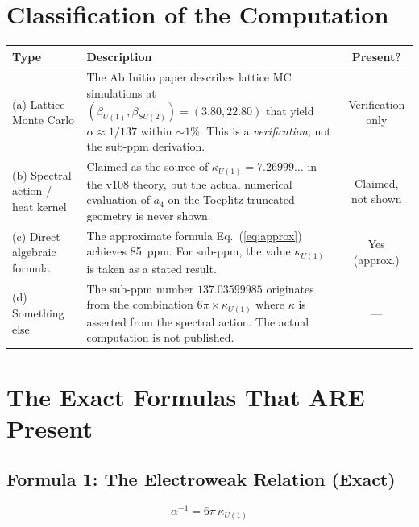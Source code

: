 \documentclass[11pt]{article}
\begin{document}
\section{Classification of the Computation}

\begin{center}
\renewcommand{\arraystretch}{1.4}
\begin{tabular}{lp{8cm}c}
\toprule
\textbf{Type} & \textbf{Description} & \textbf{Present?} \\
\midrule
(a) Lattice Monte Carlo &
  The Ab Initio paper describes lattice MC simulations at
  $(\beta_{U(1)}, \beta_{SU(2)}) = (3.80, 22.80)$ that yield
  $\alpha \approx 1/137$ within $\sim 1\%$. This is a
  \emph{verification}, not the sub-ppm derivation. & Verification only \\
(b) Spectral action / heat kernel &
  Claimed as the source of $\kappa_{U(1)} = 7.26999\ldots$ in
  the v108 theory, but the actual numerical evaluation of $a_4$
  on the Toeplitz-truncated geometry is never shown. & Claimed, not shown \\
(c) Direct algebraic formula &
  The approximate formula Eq.~(\ref{eq:approx}) achieves 85~ppm.
  For sub-ppm, the value $\kappa_{U(1)}$ is taken as a stated result. & Yes (approx.) \\
(d) Something else &
  The sub-ppm number $137.03599985$ originates from the combination
  $6\pi \times \kappa_{U(1)}$ where $\kappa$ is asserted from the
  spectral action. The actual computation is not published. & --- \\
\bottomrule
\end{tabular}
\end{center}

\section{The Exact Formulas That ARE Present}

\subsection{Formula 1: The Electroweak Relation (Exact)}

\begin{equation}
\boxed{\alpha^{-1} = 6\pi\,\kappa_{U(1)}}
\end{equation}
\end{document}
